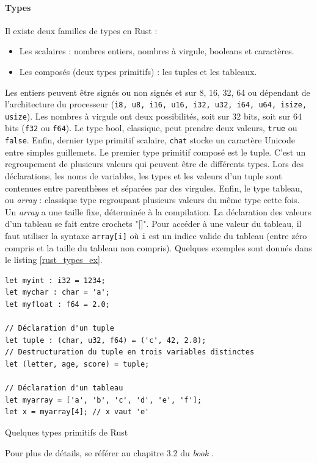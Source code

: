 \documentclass[a4paper, 12pt]{article}
\newenvironment{code}{\captionsetup{type=listing}}{}
\begin{document}
\paragraph{Types}\label{rust_types}
Il existe deux familles de types en Rust : 
\begin{itemize}
    \item Les scalaires : nombres entiers, nombres à virgule, booleans et caractères.
    \item Les composés (deux types primitifs) : les tuples et les tableaux.
\end{itemize}
Les entiers peuvent être signés ou non signés et sur 8, 16, 32, 64 ou dépendant de l'architecture
du processeur (\texttt{i8, u8, i16, u16, i32, u32, i64, u64, isize, usize}). Les nombres 
à virgule ont deux possibilités, soit sur 32 bits, soit sur 64 bits (\texttt{f32} ou 
\texttt{f64}). Le type bool, classique, peut prendre deux valeurs, \texttt{true} 
ou \texttt{false}. Enfin, dernier type primitif scalaire, \texttt{chat} stocke 
un caractère Unicode entre simples guillemets. Le premier type primitif composé est le tuple. C'est 
un regroupement de plusieurs valeurs qui peuvent être de différents types. Lors des déclarations, 
les noms de variables, les types et les valeurs d'un tuple sont contenues entre parenthèses et 
séparées par des virgules. Enfin, le type tableau, ou \textit{array} : classique type regroupant 
plusieurs valeurs du même type cette fois. Un \textit{array} a une taille fixe, déterminée à la 
compilation. La déclaration des valeurs d'un tableau se fait entre crochets "[]". Pour accéder à une 
valeur du tableau, il faut utiliser la syntaxe \texttt{array[i]} où \texttt{i} 
est un indice valide du tableau (entre zéro compris et la taille du tableau non compris). Quelques 
exemples sont donnés dans le listing \ref{rust_types_ex}.
\bigbreak
\begin{code}
    \begin{verbatim}
let myint : i32 = 1234;
let mychar : char = 'a';
let myfloat : f64 = 2.0;

// Déclaration d'un tuple
let tuple : (char, u32, f64) = ('c', 42, 2.8);
// Destructuration du tuple en trois variables distinctes
let (letter, age, score) = tuple;

// Déclaration d'un tableau
let myarray = ['a', 'b', 'c', 'd', 'e', 'f'];
let x = myarray[4]; // x vaut 'e'
    \end{verbatim}
    \caption{Quelques types primitifs de Rust}
    \label{rust_types_ex}
\end{code}
\bigbreak
Pour plus de détails, se référer au chapitre 3.2 du \textit{book} \cite{ref0}.
\end{document}
